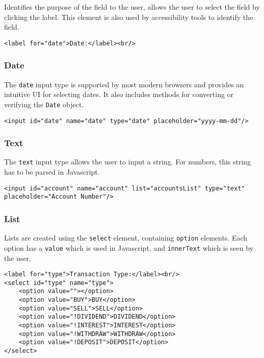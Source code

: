 \documentclass[letterpaper]{article}
\begin{document}
Identifies the purpose of the field to the user, allows the user to select the field by clicking the label.
This element is also used by accessibility tools to identify the field.
\begin{lstlisting}[firstnumber=22]
<label for="date">Date:</label><br/>
\end{lstlisting}

\subsubsection{Date}

The \lstinline{date} input type is supported by most modern browsers and provides an intuitive UI for selecting dates.
It also includes methods for converting or verifying the \lstinline{Date} object.
\begin{lstlisting}[firstnumber=13]
<input id="date" name="date" type="date" placeholder="yyyy-mm-dd"/>
\end{lstlisting}

\subsubsection{Text}

The \lstinline{text} input type allows the user to input a string. For numbers, this string has to be parsed in Javascript.
\begin{lstlisting}[firstnumber=28]
<input id="account" name="account" list="accountsList" type="text" placeholder="Account Number"/>
\end{lstlisting}

\subsubsection{List}

Lists are created using the \lstinline{select} element, containing \lstinline{option} elements.
Each option has a \lstinline{value} which is used in Javascript, and \lstinline{innerText} which is seen by the user.
\begin{lstlisting}[firstnumber=34]
<label for="type">Transaction Type:</label><br/>
<select id="type" name="type">
    <option value=""></option>
    <option value="BUY">BUY</option>
    <option value="SELL">SELL</option>
    <option value="!DIVIDEND">DIVIDEND</option>
    <option value="!INTEREST">INTEREST</option>
    <option value="!WITHDRAW">WITHDRAW</option>
    <option value="!DEPOSIT">DEPOSIT</option>
</select>
\end{lstlisting}
\end{document}
